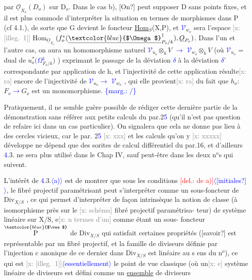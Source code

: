 \documentclass[11pt]{article}
\newcommand{\scanpage}[1]{\par\bigskip\noindent{\small\sffamily[scan #1]}\par}
\newcommand{\mspage}[1]{{\small\sffamily[p.\,#1]}}
\newcommand{\hand}[1]{\textcolor{blue}{#1}}
\let\over\relax
\newcommand{\over}[2]{\textcolor{gray}{#1}\textcolor{blue}{\ensuremath{^{\!\nearrow}}#2}}
\newcommand{\inserted}[2][]{\textcolor{blue}{$\langle$#2$\rangle$}}
\newcommand{\margin}[1]{\textcolor{blue}{\{\textsf{marg.:} #1\}}}
\newcommand{\deleted}[1]{\textcolor{red}{[\textsf{del.:} #1]}}
\newcommand{\xout}[1]{\textcolor{gray}{[\textsf{x:} #1]}}
\newcommand{\uline}[1]{\underline{#1}}
\newcommand{\unsure}[1]{[#1?]}
\newcommand{\illegible}[1]{[\textsf{illeg.\ #1}]}
\begin{document}
\mspage{\hand{130}}

\clearpage
\scanpage{25/131}
\mspage{34}

par $\underline{\mathcal{O}}_{X_o}(D_o)$ sur D$_o$. Dans le cas b), \unsure{On} peut supposer D sans points
fixes, et il est plus commode d'interpréter la situation en termes de
morphismes dans P (cf 4.1.), de sorte que G devient le foncteur
\underline{Hom}$_S$(X,P), et \hand{$\mathcal{V}$}$_{w_o}$ sera l'espace \xout{\illegible{1}} Hom$_{\underline{O}_{X_o}}$$(f_o^{*}(\underline{\hand{$\Omega$}}^{1}_{P_o/k}), \underline{O}_{P_o})$.
Dans l'un et l'autre cas, on aura un homomorphisme naturel
\hand{$\mathcal{V}$}$_{u_o}\otimes_k V$ \hand{$\to$} \hand{$\mathcal{V}$}$_{w_o}\otimes_k V$ (où \hand{$\mathcal{V}$}$_{u_o}$ = dual de $u_o^{*}($\hand{$\Omega$}$^{1}_{F_o/k})$ ) exprimant le passage
de la déviation \hand{$\delta$} à la déviation \hand{$\delta$}' correspondante par application de h,
et l'injectivité de cette application résulte\xout{ra} encore de l'injectivité
de \hand{$\mathcal{V}$}$_{u_o}$\hand{$\to$} \hand{$\mathcal{V}$}$_{w_o}$ , qui elle provient\xout{ra} du fait que $h_o$: $F_o$\hand{$\to$}$G_o$ est un
monomorphisme.
\margin{$/$}

Pratiquement, il ne semble guère possible de rédiger cette dernière
partie de la démonstration sans référer aux petits calculs du par.2\hand{5}
(qu'il n'est pas question de refaire ici dans un cas particulier). On
signalera que cela ne donne pas lieu à des cercles vicieux, car le par.
2\hand{5} \xout{xxx} et les calculs qu'on y \xout{xxxxx} développe ne dépend que des sorites
de calcul différentiel du par.16, et d'ailleurs \hand{4}.3. ne sera plus
utilisé dans le Chap IV, sauf peut-être dans les deux n$^{o}$s qui suivent.

L'intérêt de \hand{4}.3.\inserted{a)} est de montrer que sous les conditions \deleted{de a)}\inserted{\unsure{initiales}},
le fibré projectif paramétrisant peut s'interpréter comme un sous-foncteur
de Div$_{X/S}$ , ce qui permet d'interpréter de façon intrinsèque la notion
de classe (à isomorphisme près sur le \xout{schéma} fibré projectif paramétrisa-%
teur) de système linéaire sur X/S, e\xout{n termes d'un} comme étant un sous-
foncteur $\overset{\hand{$\vee$}}{\text{P}}$ de Div$_{X/S}$ qui satisfait certaines propriétés (\unsure{savoir} est
représentable par un fibré projectif, et la famille de diviseurs définie
par l'injection c anonique de ce dernier dans Div$_{X/S}$ est linéaire au s ens
du n$^{o}$\over{4}{3}), ce qui est \xout{\illegible{1}}\inserted[typed]{essentiellement} le point de vue classique (où un\xout{e}
système linéaire de diviseurs est défini comme un \uline{ensemble} de diviseurs
\end{document}
